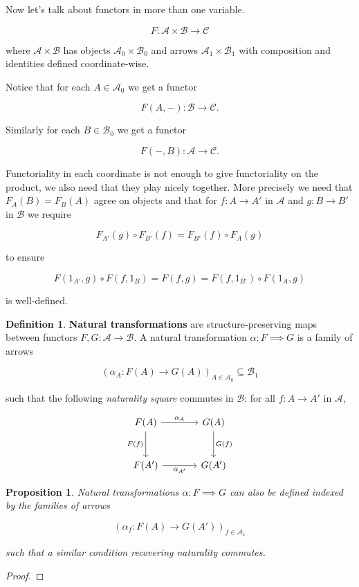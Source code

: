\documentclass[11pt]{amsart}
\theoremstyle{plain}
\newtheorem{prop}[thm]{Proposition}
\theoremstyle{definition}
\newtheorem{defn}[thm]{Definition}
\newcommand{\cA}{{\mathcal A}}
\newcommand{\cB}{{\mathcal B}}
\newcommand{\cC}{{\mathcal C}}
\newcommand{\noi}{{\noindent}}
\begin{document}
Now let's talk about functors in more than one variable. 

\[ F : \cA \times \cB \to \cC \]

\noi where $\cA \times \cB$ has objects $\cA_0 \times \cB_0$ and arrows $\cA_1 \times \cB_1$ with composition and identities defined coordinate-wise. \medskip 

\noi Notice that for each $A \in \cA_0$ we get a functor 

\[ F (A, -) : \cB \to \cC .\]

\noi Similarly for each $B \in \cB_0$ we get a functor 

\[ F(- , B) : \cA \to \cC .\]

\noi Functoriality in each coordinate is not enough to give functoriality on the product, we also need that they play nicely together. More precisely we need that $F_A (B) = F_B(A)$ agree on objects and that for $f : A \to A'$ in $\cA$ and $g : B \to B'$ in $\cB$ we require

\[ F_{A'}(g) \circ F_{B'}(f) = F_{B'}(f) \circ F_{A} (g) \]

\noi to ensure 

\[ F(1_{A'}, g) \circ F(f, 1_B) = F(f,g) = F(f, 1_{B'}) \circ F(1_A, g)\]

\noi is well-defined. \bigskip 

\begin{defn}
\textbf{Natural transformations} are structure-preserving maps between functors $F, G : \cA \to \cB$. A natural transformation $\alpha : F \implies G$ is a family of arrows 

\[ (\alpha_A : F(A) \to G(A))_{A \in \cA_0 }\subseteq \cB_1\]

\noi such that the following \textit{naturality square} commutes in $\cB$: for all $f : A \to A'$ in $\cA$, 

\[ \begin{tikzcd}[column sep = large, row sep = large]
F(A) \dar["F(f)"'] \rar["\alpha_A"] & G(A) \dar["G(f)"] \\
F(A') \rar["\alpha_{A'}"'] & G(A')
\end{tikzcd} 
\] 
\end{defn}

\begin{prop}
Natural transformations $\alpha : F \implies G$ can also be defined indexed by the families of arrows 

\[ (\alpha_f : F(A) \to G(A'))_{f \in \cA_1}\]

\noi such that a similar condition recovering naturality commutes. 
\end{prop}
\begin{proof}
\end{proof}
\end{document}

